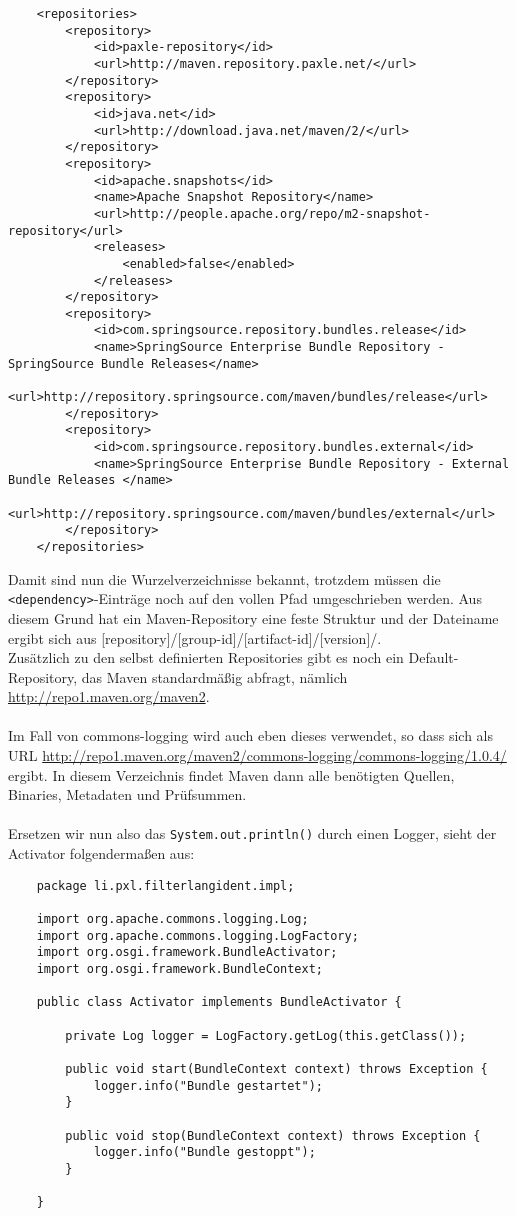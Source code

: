 \documentclass[a4paper,12pt]{scrartcl}
\begin{document}
\begin{lstlisting}
	<repositories>
		<repository>
			<id>paxle-repository</id>
			<url>http://maven.repository.paxle.net/</url>
		</repository>
		<repository>
			<id>java.net</id>
			<url>http://download.java.net/maven/2/</url>
		</repository>
		<repository>
			<id>apache.snapshots</id>
			<name>Apache Snapshot Repository</name>
			<url>http://people.apache.org/repo/m2-snapshot-repository</url>
			<releases>
				<enabled>false</enabled>
			</releases>
		</repository>
		<repository>
			<id>com.springsource.repository.bundles.release</id>
			<name>SpringSource Enterprise Bundle Repository - SpringSource Bundle Releases</name>
			<url>http://repository.springsource.com/maven/bundles/release</url>
		</repository>
		<repository>
			<id>com.springsource.repository.bundles.external</id>
			<name>SpringSource Enterprise Bundle Repository - External Bundle Releases </name>
			<url>http://repository.springsource.com/maven/bundles/external</url>
		</repository>
	</repositories>
\end{lstlisting}
Damit sind nun die Wurzelverzeichnisse bekannt, trotzdem müssen die \lstinline[breaklines=false, basicstyle=\itshape]|<dependency>|-Einträge noch auf den vollen Pfad umgeschrieben werden. Aus diesem Grund hat ein Maven-Repository eine feste Struktur und der Dateiname ergibt sich aus [repository]/[group-id]/[artifact-id]/[version]/.\\
Zusätzlich zu den selbst definierten Repositories gibt es noch ein Default-Repository, das Maven standardmäßig abfragt, nämlich \href{http://repo1.maven.org/maven2}{http://repo1.maven.org/maven2}.\\
\\
Im Fall von commons-logging wird auch eben dieses verwendet, so dass sich als URL \href{http://repo1.maven.org/maven2/commons-logging/commons-logging/1.0.4/}{http://repo1.maven.org/maven2/commons-logging/commons-logging/1.0.4/} ergibt. In diesem Verzeichnis findet Maven dann alle benötigten Quellen, Binaries, Metadaten und Prüfsummen.\\
\\
Ersetzen wir nun also das \lstinline[breaklines=false, basicstyle=\itshape]|System.out.println()| durch einen Logger, sieht der Activator folgendermaßen aus:
\begin{lstlisting}
	package li.pxl.filterlangident.impl;
	
	import org.apache.commons.logging.Log;
	import org.apache.commons.logging.LogFactory;
	import org.osgi.framework.BundleActivator;
	import org.osgi.framework.BundleContext;
	
	public class Activator implements BundleActivator {
	
		private Log logger = LogFactory.getLog(this.getClass());
		
		public void start(BundleContext context) throws Exception {
			logger.info("Bundle gestartet");
		}
	
		public void stop(BundleContext context) throws Exception {
			logger.info("Bundle gestoppt");
		}
	
	}
\end{lstlisting}
\end{document}
